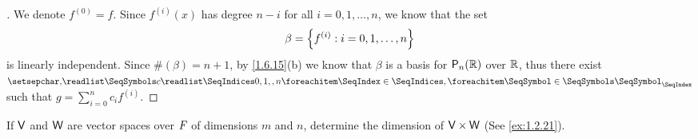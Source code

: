 \begin{proof}[]
	We denote \(f^{(0)} = f\).
	Since \(f^{(i)}(x)\) has degree \(n - i\) for all \(i = 0, 1, \dots, n\), we know that the set
	\[
		\beta = \left\lbrace f^{(i)} : i = 0, 1, \dots, n\right\rbrace
	\]
	is linearly independent.
	Since \(\#(\beta) = n + 1\), by \cref{1.6.15}(b) we know that \(\beta\) is a basis for \(\ps[n]{\R}\) over \(\mathbb{R}\), thus there exist \(\seq{c}{0,1,,n}\) such that \(g = \sum_{i = 0}^n c_i f^{(i)}\).
\end{proof}

\begin{ex}\label{ex:1.6.25}
	If \(\mathsf{V}\) and \(\mathsf{W}\) are vector spaces over \(\mathit{F}\) of dimensions \(m\) and \(n\), determine the dimension of \(\mathsf{V} \times \mathsf{W}\) (See \cref{ex:1.2.21}).
\end{ex}

